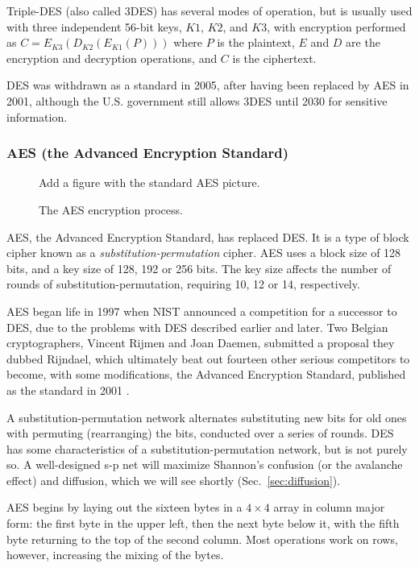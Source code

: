 Triple-DES (also called 3DES) has several modes of operation, but is
usually used with three independent 56-bit keys, $K1$, $K2$, and $K3$,
with encryption performed as $C = E_{K3}(D_{K2}(E_{K1}(P)))$ where $P$
is the plaintext, $E$ and $D$ are the encryption and decryption
operations, and $C$ is the ciphertext.

DES was withdrawn as a standard in 2005, after having been replaced by
AES in 2001, although the U.S. government still allows 3DES until 2030
for sensitive information. 

\subsubsection{AES (the Advanced Encryption Standard)}

\begin{figure}
  {\color{Magenta} Add a figure with the standard AES picture.}
  \caption{The AES encryption process.}
  \label{fig:aes}
\end{figure}

AES, the Advanced Encryption Standard, has replaced DES.  It is a type of block cipher known as a \emph{substitution-permutation} cipher.  AES uses a block size of 128 bits, and a key size of 128, 192 or 256 bits. The key size affects the number of rounds of substitution-permutation, requiring 10, 12 or 14, respectively.

AES began life in 1997 when NIST announced a competition for a successor to DES, due to the problems with DES described earlier and later. Two Belgian cryptographers, Vincent Rijmen and Joan Daemen, submitted a proposal they dubbed Rijndael, which ultimately beat out fourteen other serious competitors to become, with some modifications, the Advanced Encryption Standard, published as the standard in 2001 .

A substitution-permutation network alternates substituting new bits
for old ones with permuting (rearranging) the bits, conducted over a
series of rounds. DES has some characteristics of a
substitution-permutation network, but is not purely so. A
well-designed s-p net will maximize Shannon's confusion (or the
avalanche effect) and diffusion, which we will see shortly
(Sec.~\ref{sec:diffusion}).

AES begins by laying out the sixteen bytes in a $4\times 4$ array in
column major form: the first byte in the upper left, then the next
byte below it, with the fifth byte returning to the top of the second
column. Most operations work on rows, however, increasing the mixing
of the bytes.

